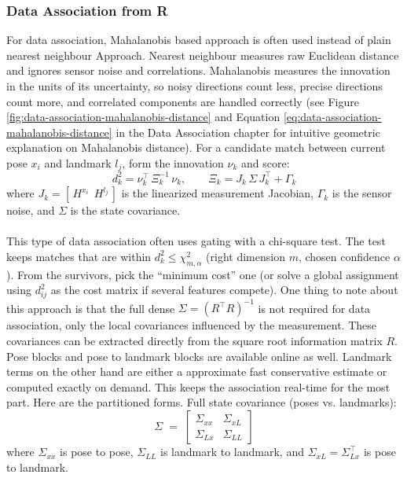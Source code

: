 \subsubsection{Data Association from R}\label{sssec:iSAM-data-association}
For data association, Mahalanobis based approach is often used instead of plain nearest neighbour Approach. Nearest neighbour measures raw Euclidean distance and ignores sensor noise and correlations. Mahalanobis measures the innovation in the units of its uncertainty, so noisy directions count less, precise directions count more, and correlated components are handled correctly (see Figure \ref{fig:data-association-mahalanobis-distance} and Equation \eqref{eq:data-association-mahalanobis-distance} in the Data Association chapter for intuitive geometric explanation on Mahalanobis distance). For a candidate match between current pose $x_i$ and landmark $l_j$, form the innovation $\nu_k$ and score:
$$
    d_k^2=\nu_k^\top\,\Xi_k^{-1}\,\nu_k,\qquad
    \Xi_k=J_k\,\Sigma\,J_k^\top+\Gamma_k
$$
\noindent
where $J_k=[\,H^{x_i}\ \ H^{l_j}\,]$ is the linearized measurement Jacobian, $\Gamma_k$ is the sensor noise, and $\Sigma$ is the state covariance. 
\\ \\
This type of data association often uses gating with a chi-square test. The test keeps matches that are within $d_k^2\le \chi^2_{m,\alpha}$ (right dimension $m$, chosen confidence $\alpha$). From the survivors, pick the ``minimum cost'' one (or solve a global assignment using $d_{ij}^2$ as the cost matrix if several features compete). One thing to note about this approach is that the full dense $\Sigma=(R^\top R)^{-1}$ is not required for data association, only the local covariances influenced by the measurement. These covariances can be extracted directly from the square root information matrix $R$. Pose blocks and pose to landmark blocks are available online as well. Landmark terms on the other hand are either a approximate fast conservative estimate or computed exactly on demand. This keeps the association real-time for the most part.
Here are the partitioned forms.
Full state covariance (poses vs. landmarks):
$$
    \Sigma \;=\;
    \begin{bmatrix}
    \Sigma_{xx} & \Sigma_{xL}\\[4pt]
    \Sigma_{Lx} & \Sigma_{LL}
    \end{bmatrix}
$$
\noindent
where $\Sigma_{xx}$ is pose to pose, $\Sigma_{LL}$ is landmark to landmark, and $\Sigma_{xL}=\Sigma_{Lx}^\top$ is pose to landmark.
\\ \\
